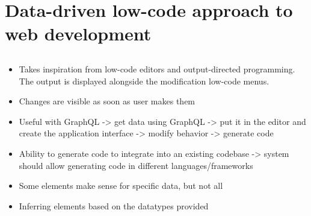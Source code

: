 \chapter{Data-driven low-code approach to web development}
\label{chap:approach}
\section{}
\begin{itemize}
    \item Takes inspiration from low-code editors and output-directed programming. The output is displayed alongside the modification low-code menus.
    \item Changes are visible as soon as user makes them
    \item Useful with GraphQL -> get data using GraphQL -> put it in the editor and create the application interface -> modify behavior -> generate code
    \item Ability to generate code to integrate into an existing codebase -> system should allow generating code in different languages/frameworks
    \item Some elements make sense for specific data, but not all
    \item Inferring elements based on the datatypes provided
\end{itemize}